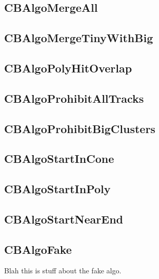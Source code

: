 \documentclass{article}
\begin{document}
\subsection{CBAlgoMergeAll}\label{sec:CBAlgoMergeAll}
\subsection{CBAlgoMergeTinyWithBig}\label{sec:CBAlgoMergeTinyWithBig}
\subsection{CBAlgoPolyHitOverlap}\label{sec:CBAlgoPolyHitOverlap}
\subsection{CBAlgoProhibitAllTracks}\label{sec:CBAlgoProhibitAllTracks}
\subsection{CBAlgoProhibitBigClusters}\label{sec:CBAlgoProhibitBigClusters}
\subsection{CBAlgoStartInCone}\label{sec:CBAlgoStartInCone}
\subsection{CBAlgoStartInPoly}\label{sec:CBAlgoStartInPoly}
\subsection{CBAlgoStartNearEnd}\label{sec:CBAlgoStartNearEnd}


\subsection{CBAlgoFake}
\label{sec:CBAlgoFake}
Blah this is stuff about the fake algo.
\end{document}
